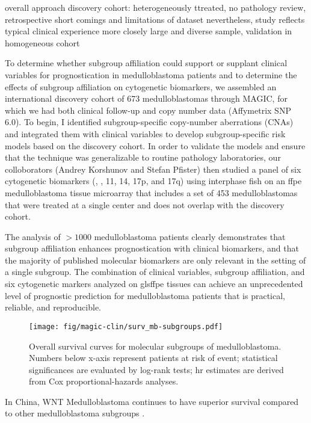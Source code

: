 overall approach
discovery cohort: heterogeneously ttreated, no pathology review, retrospective
short comings and limitations of dataset
nevertheless, study reflects typical clinical experience more closely
large and diverse sample, validation in homogeneous cohort

To determine whether subgroup affiliation could support or supplant clinical variables for prognostication in medulloblastoma patients and to determine the effects of subgroup affiliation on cytogenetic biomarkers, we assembled an international discovery cohort of 673 medulloblastomas through MAGIC, for which we had both clinical follow-up and copy number data (Affymetrix SNP 6.0). To begin, I identified subgroup-specific copy-number aberrations (CNAs) and integrated them with clinical variables to develop subgroup-specific risk models based on the discovery cohort. In order to validate the models and ensure that the technique was generalizable to routine pathology laboratories, our colloborators (Andrey Korshunov and Stefan Pfister) then studied a panel of six cytogenetic biomarkers (, , 11, 14, 17p, and 17q) using interphase \gls{fish} on an \gls{ffpe} medulloblastoma tissue microarray that includes a set of 453 medulloblastomas that were treated at a single center and does not overlap with the discovery cohort.

The analysis of $> 1000$ medulloblastoma patients clearly demonstrates that subgroup affiliation enhances prognostication with clinical biomarkers, and that the majority of published molecular biomarkers are only relevant in the setting of a single subgroup. The combination of clinical variables, subgroup affiliation, and six cytogenetic markers analyzed on gls{ffpe} tissues can achieve an unprecedented level of prognostic prediction for medulloblastoma patients that is practical, reliable, and reproducible.

\begin{SCfigure}[5][b]
	\texttt{[image: fig/magic-clin/surv\_mb-subgroups.pdf]}
	\caption[Overall survival curves for molecular subgroups of medulloblastoma]
	{
	Overall survival curves for molecular subgroups of medulloblastoma.
	Numbers below x-axis represent patients at risk of event; statistical significances are evaluated by log-rank tests; \gls{hr} estimates are derived from Cox proportional-hazards analyses.
	}
	\label{fig:surv_mb-subgroups}
\end{SCfigure}

In China, WNT Medulloblastoma continues to have superior survival compared to other medulloblastoma subgroups .

